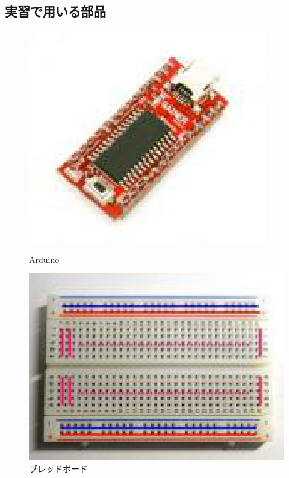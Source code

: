 \documentclass[11pt,a4paper]{jarticle}
\begin{document}
\subsection*{実習で用いる部品}

\begin{figure}[h!]
 \begin{minipage}{0.5\columnwidth}
  \centering
  \includegraphics[height=0.5\columnwidth]{img/arduino.eps}
  \caption{Arduino}
 \end{minipage}
 \begin{minipage}{0.5\columnwidth}
  \centering
  \includegraphics[height=0.5\columnwidth]{img/breadboard.eps}
  \caption{ブレッドボード}
 \end{minipage}
\end{figure}
\end{document}
